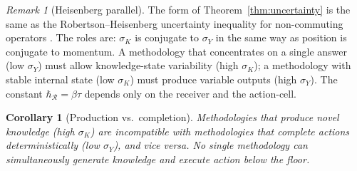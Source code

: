 \documentclass[11pt,twocolumn,a4paper]{article}
\newtheorem{corollary}[theorem]{Corollary}
\theoremstyle{definition}
\theoremstyle{remark}
\newtheorem{remark}[theorem]{Remark}
\newcommand{\receiver}{\mathcal{R}}
\newcommand{\hbarR}{\hbar_{\receiver}}
\newcommand{\disp}{\sigma}
\begin{document}
\begin{remark}[Heisenberg parallel]
The form of Theorem~\ref{thm:uncertainty} is the same as the Robertson--Heisenberg uncertainty inequality for non-commuting operators \citep{heisenberg1927uber,robertson1929uncertainty}. The roles are: $\disp_K$ is conjugate to $\disp_Y$ in the same way as position is conjugate to momentum. A methodology that concentrates on a single answer (low $\disp_Y$) must allow knowledge-state variability (high $\disp_K$); a methodology with stable internal state (low $\disp_K$) must produce variable outputs (high $\disp_Y$). The constant $\hbarR = \beta\tau$ depends only on the receiver and the action-cell.
\end{remark}

\begin{corollary}[Production vs.\ completion]
\label{cor:prod-comp}
Methodologies that produce novel knowledge (high $\disp_K$) are incompatible with methodologies that complete actions deterministically (low $\disp_Y$), and vice versa. No single methodology can simultaneously generate knowledge and execute action below the floor.
\end{corollary}
\end{document}
